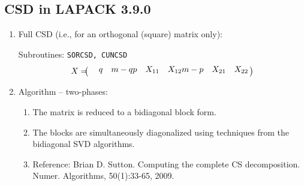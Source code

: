 \subsection{CSD in LAPACK 3.9.0} 
\begin{enumerate} 
\item Full CSD (i.e., for an orthogonal (square) matrix only): 

Subroutines: {\tt SORCSD, CUNCSD} 
\[ 
X = \bordermatrix{ 
      & q  & m-q \\
p     & X_{11} & X_{12} \\
m-p   & X_{21} & X_{22}
} 
\] 


\item Algorithm -- two-phases: 
\begin{enumerate} 
\item 
The matrix is reduced to a bidiagonal block form.

\item 
The blocks are simultaneously diagonalized using techniques 
from the bidiagonal SVD algorithms.

\item Reference: 
Brian D. Sutton. 
Computing the complete CS decomposition. 
Numer. Algorithms, 50(1):33-65, 2009.
\end{enumerate} 

\end{enumerate} 
    
